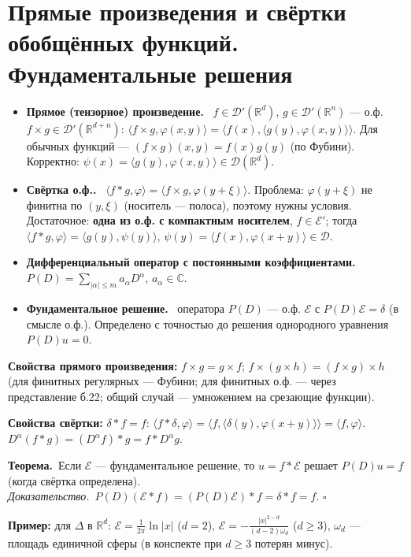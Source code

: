 \documentclass[11pt,a4paper]{article}
\newcommand{\CC}{\mathbb C}
\newcommand{\RR}{\mathbb R}
\newcommand{\DD}{\mathcal D}
\newcommand{\EE}{\mathcal E}
\newcommand{\df}[1]{\textbf{#1.}~}
\newcommand{\thm}{\textbf{Теорема.}~}
\newcommand{\pf}{\textit{Доказательство.}~}
\newcommand{\qedd}{\hfill$\square$}
\begin{document}
\section{Прямые произведения и свёртки обобщённых функций. Фундаментальные решения}
\begin{defs}
\begin{itemize}
\item \df{Прямое (тензорное) произведение} $f\in\DD'(\RR^d)$, $g\in\DD'(\RR^n)$ — о.ф. $f\times g\in\DD'(\RR^{d+n})$:
$\langle f\times g,\varphi(x,y)\rangle=\langle f(x),\langle g(y),\varphi(x,y)\rangle\rangle$. Для обычных функций — $(f\times g)(x,y)=f(x)g(y)$ (по Фубини). Корректно: $\psi(x)=\langle g(y),\varphi(x,y)\rangle\in\DD(\RR^d)$.
\item \df{Свёртка о.ф.} $\langle f*g,\varphi\rangle=\langle f\times g,\varphi(y+\xi)\rangle$. Проблема: $\varphi(y+\xi)$ не финитна по $(y,\xi)$ (носитель — полоса), поэтому нужны условия. Достаточное: \textbf{одна из о.ф. с компактным носителем}, $f\in\EE'$; тогда
$\langle f*g,\varphi\rangle=\langle g(y),\psi(y)\rangle$, $\psi(y)=\langle f(x),\varphi(x+y)\rangle\in\DD$.
\item \df{Дифференциальный оператор с постоянными коэффициентами} $P(D)=\sum_{|\alpha|\le m}a_\alpha D^\alpha$, $a_\alpha\in\CC$.
\item \df{Фундаментальное решение} оператора $P(D)$ — о.ф. $\mathcal E$ с $P(D)\mathcal E=\delta$ (в смысле о.ф.). Определено с точностью до решения однородного уравнения $P(D)u=0$.
\end{itemize}
\end{defs}

\textbf{Свойства прямого произведения:} $f\times g=g\times f$; $f\times(g\times h)=(f\times g)\times h$ (для финитных регулярных — Фубини; для финитных о.ф. — через представление б.22; общий случай — умножением на срезающие функции).

\textbf{Свойства свёртки:} $\delta*f=f$: $\langle f*\delta,\varphi\rangle=\langle f,\langle\delta(y),\varphi(x+y)\rangle\rangle=\langle f,\varphi\rangle$. $D^\alpha(f*g)=(D^\alpha f)*g=f*D^\alpha g$.

\thm Если $\mathcal E$ — фундаментальное решение, то $u=f*\mathcal E$ решает $P(D)u=f$ (когда свёртка определена).\\
\pf $P(D)(\mathcal E*f)=(P(D)\mathcal E)*f=\delta*f=f$. \qedd

\textbf{Пример:} для $\Delta$ в $\RR^d$: $\mathcal E=\frac1{2\pi}\ln|x|$ ($d=2$), $\mathcal E=-\frac{|x|^{2-d}}{(d-2)\omega_d}$ ($d\ge3$), $\omega_d$ — площадь единичной сферы (в конспекте при $d\ge3$ потерян минус).
\end{document}
